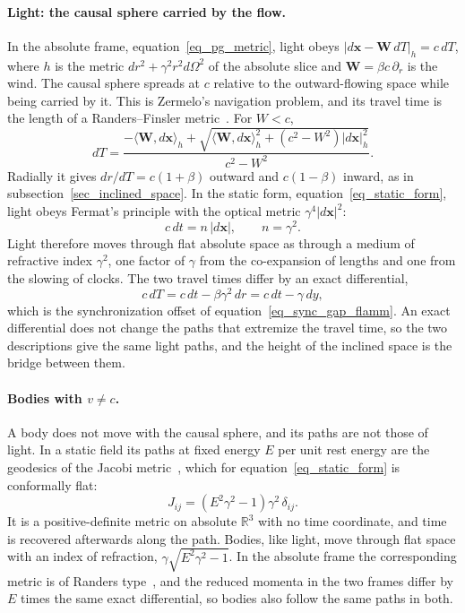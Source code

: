 \documentclass{iopjournal}
\begin{document}
\paragraph{Light: the causal sphere carried by the flow.} In the absolute frame, equation~\eqref{eq_pg_metric}, light obeys $|d\mathbf{x}-\mathbf{W}\,dT|_h=c\,dT$, where $h$ is the metric $dr^2+\gamma^2r^2d\Omega^2$ of the absolute slice and $\mathbf{W}=\beta c\,\partial_r$ is the wind. The causal sphere spreads at $c$ relative to the outward-flowing space while being carried by it. This is Zermelo's navigation problem, and its travel time is the length of a Randers--Finsler metric~\cite{GibbonsZermelo2009}. For $W<c$,
\begin{equation}\label{eq_zermelo_time}
    dT=\frac{-\langle\mathbf{W},d\mathbf{x}\rangle_h+\sqrt{\langle\mathbf{W},d\mathbf{x}\rangle_h^2+\left(c^2-W^2\right)|d\mathbf{x}|_h^2}}{c^2-W^2}.
\end{equation}
Radially it gives $dr/dT=c(1+\beta)$ outward and $c(1-\beta)$ inward, as in subsection~\ref{sec_inclined_space}. In the static form, equation~\eqref{eq_static_form}, light obeys Fermat's principle with the optical metric $\gamma^4|d\mathbf{x}|^2$:
\begin{equation}\label{eq_optical_index}
    c\,dt=n\,|d\mathbf{x}|,
    \qquad
    n=\gamma^2 .
\end{equation}
Light therefore moves through flat absolute space as through a medium of refractive index $\gamma^2$, one factor of $\gamma$ from the co-expansion of lengths and one from the slowing of clocks. The two travel times differ by an exact differential,
\begin{equation}\label{eq_randers_fermat}
    c\,dT=c\,dt-\beta\gamma^2\,dr=c\,dt-\gamma\,dy ,
\end{equation}
which is the synchronization offset of equation~\eqref{eq_sync_gap_flamm}. An exact differential does not change the paths that extremize the travel time, so the two descriptions give the same light paths, and the height of the inclined space is the bridge between them.

\paragraph{Bodies with $v\neq c$.} A body does not move with the causal sphere, and its paths are not those of light. In a static field its paths at fixed energy $E$ per unit rest energy are the geodesics of the Jacobi metric~\cite{Gibbons2016Jacobi}, which for equation~\eqref{eq_static_form} is conformally flat:
\begin{equation}\label{eq_jacobi}
    J_{ij}=\left(E^2\gamma^2-1\right)\gamma^2\,\delta_{ij}.
\end{equation}
It is a positive-definite metric on absolute $\mathbb{R}^3$ with no time coordinate, and time is recovered afterwards along the path. Bodies, like light, move through flat space with an index of refraction, $\gamma\sqrt{E^2\gamma^2-1}$. In the absolute frame the corresponding metric is of Randers type~\cite{Chanda2019Jacobi}, and the reduced momenta in the two frames differ by $E$ times the same exact differential, so bodies also follow the same paths in both.
\end{document}
